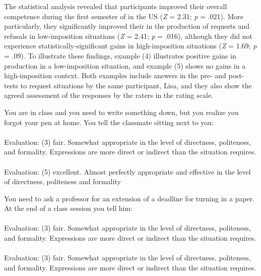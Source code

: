 \documentclass[output=paper]{langsci/langscibook}
\begin{document}
The statistical analysis revealed that participants improved their overall  competence during the first semester of  in the US (\textit{Z} = 2.31; \textit{p} = .021). More particularly, they significantly improved their  in the production of requests and refusals in low-imposition situations (\textit{Z} = 2.41; \textit{p} = .016), although they did not experience statistically-significant  gains in high-imposition situations (\textit{Z} = 1.69; \textit{p} = .09). To illustrate these findings, example (4) illustrates positive gains in  production in a low-imposition situation, and example (5) shows no gains in a high-imposition context. Both examples include answers in the pre- and post-tests to request situations by the same participant, Lisa, and they also show the agreed assessment of the responses by the raters in the  rating scale.

\ea
{You are in class and you need to write something down, but you realize you forgot your pen at home. You tell the classmate sitting next to you:}\\
  \\
  \textup{Evaluation}: (3) fair. Somewhat appropriate in the level of directness, politeness, and formality. Expressions are more direct or indirect than the situation requires.\\

  \\
  \textup{Evaluation}: (5) excellent. Almost perfectly appropriate and effective in the level of directness, politeness and formality\\
  \z
\z

\ea
{You need to ask a professor for an extension of a deadline for turning in a paper. At the end of a class session you tell him:} \\
  \\
  \textup{Evaluation}: (3) fair. Somewhat appropriate in the level of directness, politeness, and formality. Expressions are more direct or indirect than the situation requires.\\
  
  \\
  \textup{Evaluation}: (3) fair. Somewhat appropriate in the level of directness, politeness, and formality. Expressions are more direct or indirect than the situation requires.\\
  \z
\z
\end{document}
